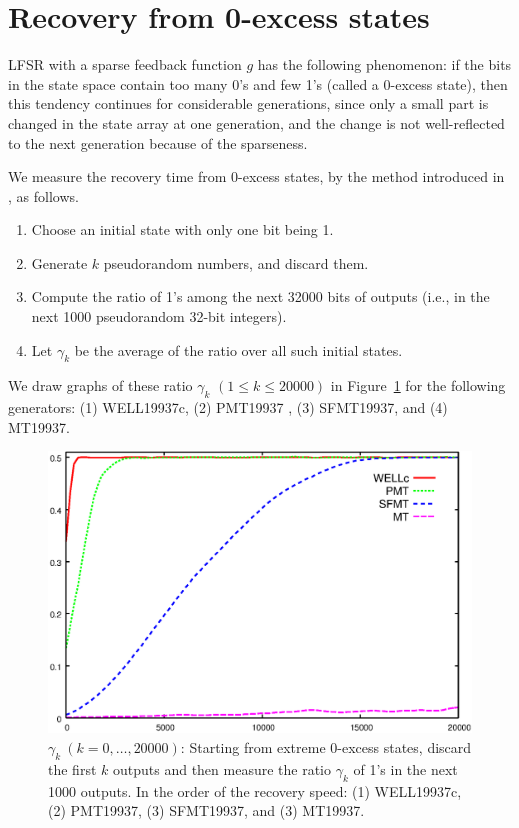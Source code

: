 \documentclass{svmult}
\begin{document}
\section{Recovery from 0-excess states}
LFSR with a sparse feedback function $g$ has
the following phenomenon: 
if the bits in the state space 
contain too many 0's and few 1's (called a 0-excess state), then
this tendency continues for considerable generations,
since only a small part is changed in the state array
at one generation, and the change is not well-reflected to 
the next generation because of the sparseness.

We measure the recovery time from 0-excess states, 
by the method introduced in \cite{WELL}, as follows.
\begin{enumerate}
\item Choose an initial state with only one bit being 1.
\item Generate $k$ pseudorandom numbers, and discard them.
\item Compute the ratio of 1's among the 
next 32000 bits of outputs
(i.e., in the next 1000 pseudorandom 32-bit integers).
\item Let $\gamma_k$ be the average of the ratio over
all such initial states.
\end{enumerate}
We draw graphs of these ratio $\gamma_k$ $(1 \leq k \leq 20000)$
in Figure~\ref{fig:zero-recovery}
for the following generators: (1) WELL19937c, 
(2) PMT19937 \cite{PMT}, (3) SFMT19937, and (4) MT19937. 
\begin{figure}
\begin{center}
\includegraphics[width=0.7\linewidth]{sfmt-zero.eps}
\end{center}
\caption{$\gamma_k \ (k=0,\ldots,20000)$:
Starting from extreme 0-excess states,
discard the first $k$ outputs and then measure
the ratio $\gamma_k$ of 1's in the next 1000 outputs. 
In the order of the recovery speed: 
(1) WELL19937c, 
(2) PMT19937, (3) SFMT19937, and (3) MT19937.
}\label{fig:zero-recovery}
\end{figure}
\end{document}
